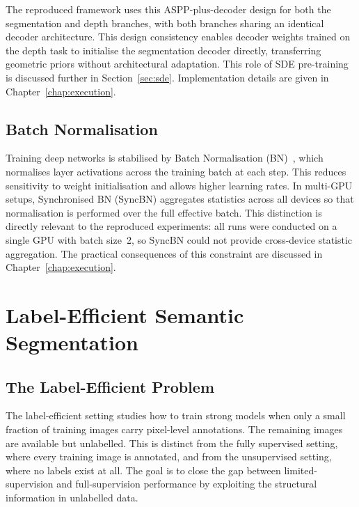 The reproduced framework uses this ASPP-plus-decoder design for both the
segmentation and depth branches, with both branches sharing an identical
decoder architecture. This design consistency enables decoder weights
trained on the depth task to initialise the segmentation decoder
directly, transferring geometric priors without architectural adaptation.
This role of SDE pre-training is discussed further in
Section~\ref{sec:sde}. Implementation details are given in
Chapter~\ref{chap:execution}.

\subsection{Batch Normalisation}

Training deep networks is stabilised by Batch Normalisation
(BN)~\cite{ioffe2015batch}, which normalises layer activations across
the training batch at each step. This reduces sensitivity to weight
initialisation and allows higher learning rates. In multi-GPU setups,
Synchronised BN (SyncBN) aggregates statistics across all devices so
that normalisation is performed over the full effective batch. This
distinction is directly relevant to the reproduced experiments: all
runs were conducted on a single GPU with batch size~2, so SyncBN could
not provide cross-device statistic aggregation.
The practical consequences of this constraint are discussed in
Chapter~\ref{chap:execution}.

\section{Label-Efficient Semantic Segmentation}
\label{sec:ssl}

\subsection{The Label-Efficient Problem}

The label-efficient setting studies how to train strong models when only
a small fraction of training images carry pixel-level annotations. The
remaining images are available but unlabelled. This is distinct from the
fully supervised setting, where every training image is annotated, and
from the unsupervised setting, where no labels exist at all. The goal is
to close the gap between limited-supervision and full-supervision
performance by exploiting the structural information in unlabelled data.

